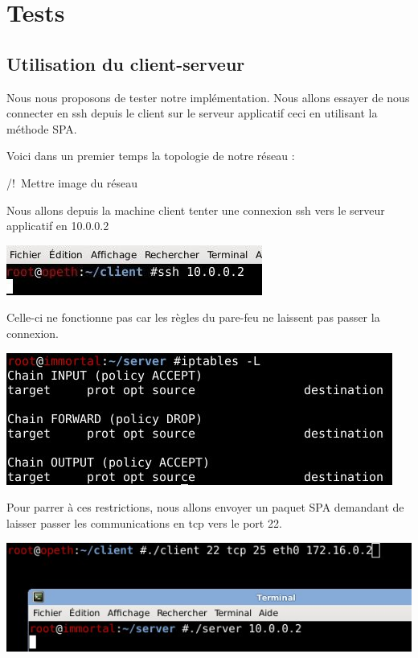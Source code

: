 \chapter{Tests}

\section{Utilisation du client-serveur}

Nous nous proposons de tester notre implémentation. Nous allons essayer de nous connecter en ssh depuis le client sur le serveur applicatif ceci en utilisant la méthode SPA.

Voici dans un premier temps la topologie de notre réseau :

/!\ Mettre image du réseau

Nous allons depuis la machine client tenter une connexion ssh vers le serveur applicatif en 10.0.0.2

\includegraphics[scale=1]{test_ssh.jpeg}

Celle-ci ne fonctionne pas car les règles du pare-feu ne laissent pas passer la connexion.

\includegraphics[scale=1]{regles_ip_avant.jpeg}

Pour parrer à ces restrictions, nous allons envoyer un paquet SPA demandant de laisser passer les communications en tcp vers le port 22.

\includegraphics[scale=1]{execution_client.jpeg}

